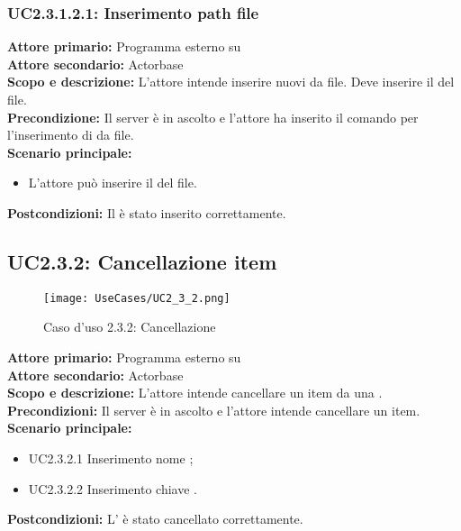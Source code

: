 \documentclass{scalatekids-article}
\begin{document}
\subsubsection{UC2.3.1.2.1: Inserimento path file} %

\textbf{Attore primario:} Programma esterno su \\
\textbf{Attore secondario:} Actorbase\\
\textbf{Scopo e descrizione:} L'attore intende inserire nuovi  da file. Deve inserire il  del file.\\
\textbf{Precondizione:} Il server è in ascolto e l'attore ha inserito il comando per l'inserimento di  da file.\\
\textbf{Scenario principale:}
\begin{itemize}
\item L'attore può inserire il  del file.
\end{itemize}
\textbf{Postcondizioni:} Il  è stato inserito correttamente.

\subsection{UC2.3.2: Cancellazione item}

\begin{figure}[H]
  \begin{center}
    \texttt{[image: UseCases/UC2\_3\_2.png]}
    \caption{Caso d'uso 2.3.2: Cancellazione }
  \end{center}
\end{figure}
\textbf{Attore primario:} Programma esterno su \\
\textbf{Attore secondario:} Actorbase\\
\textbf{Scopo e descrizione:} L'attore intende cancellare un item da una .\\
\textbf{Precondizioni:} Il server è in ascolto e l'attore intende cancellare un item.\\
\textbf{Scenario principale:}
\begin{itemize}
\item UC2.3.2.1 Inserimento nome ;
\item UC2.3.2.2 Inserimento chiave .
\end{itemize}
\textbf{Postcondizioni:} L' è stato cancellato correttamente.
\end{document}
